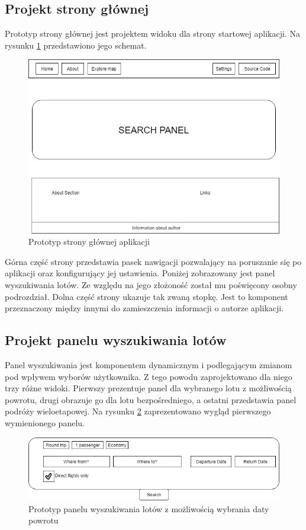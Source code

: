 \documentclass[12pt, twoside]{report}
\begin{document}
\subsection{Projekt strony głównej}
Prototyp strony głównej jest projektem widoku dla strony startowej aplikacji. Na rysunku \ref{fig:main_page_schema} przedstawiono jego schemat.

\begin{figure}[!ht]
\centering
\includegraphics[scale=0.50, keepaspectratio]{main_page_interface_project.PNG}
\caption{Prototyp strony głównej aplikacji}
\label{fig:main_page_schema}
\end{figure}

Górna część strony przedstawia pasek nawigacji pozwalający na poruszanie się po aplikacji oraz konfigurujący jej ustawienia. Poniżej zobrazowany jest panel wyszukiwania lotów. Ze względu na jego złożoność został mu poświęcony osobny podrozdział. Dolna część strony ukazuje tak zwaną stopkę. Jest to komponent przeznaczony między innymi do zamieszczenia informacji o autorze aplikacji.
\subsection{Projekt panelu wyszukiwania lotów}
Panel wyszukiwania jest komponentem dynamicznym i podlegającym zmianom pod wpływem wyborów użytkownika. Z tego powodu zaprojektowano dla niego trzy różne widoki. Pierwszy prezentuje panel dla wybranego lotu z możliwością powrotu, drugi obrazuje go dla lotu bezpośredniego, a ostatni przedstawia panel podróży wieloetapowej. Na rysunku \ref{fig:interface_project_departure} zaprezentowano wygląd pierwszego wymienionego panelu.
\begin{figure}[!ht]
\centering
\includegraphics[scale=0.60, keepaspectratio]{interface_project_departure.PNG}
\caption{Prototyp panelu wyszukiwania lotów z możliwością wybrania daty powrotu}
\label{fig:interface_project_departure}
\end{figure}
\end{document}

